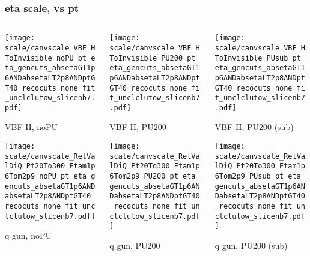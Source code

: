 \documentclass[8pt]{beamer}
\begin{document}
  \begin{frame}
  \frametitle{eta scale, vs pt}
  
  \begin{columns}
   \begin{column}{0.35\textwidth}
     \texttt{[image: scale/canvscale\_VBF\_HToInvisible\_noPU\_pt\_eta\_gencuts\_absetaGT1p6ANDabsetaLT2p8ANDptGT40\_recocuts\_none\_fit\_unclclutow\_slicenb7.pdf]}
     
     VBF H, noPU
    
     \texttt{[image: scale/canvscale\_RelValDiQ\_Pt20To300\_Etam1p6Tom2p9\_noPU\_pt\_eta\_gencuts\_absetaGT1p6ANDabsetaLT2p8ANDptGT40\_recocuts\_none\_fit\_unclclutow\_slicenb7.pdf]}
     
     q gun, noPU
   \end{column}
   \begin{column}{0.35\textwidth}
     \texttt{[image: scale/canvscale\_VBF\_HToInvisible\_PU200\_pt\_eta\_gencuts\_absetaGT1p6ANDabsetaLT2p8ANDptGT40\_recocuts\_none\_fit\_unclclutow\_slicenb7.pdf]}
     
     VBF H, PU200
    
     \texttt{[image: scale/canvscale\_RelValDiQ\_Pt20To300\_Etam1p6Tom2p9\_PU200\_pt\_eta\_gencuts\_absetaGT1p6ANDabsetaLT2p8ANDptGT40\_recocuts\_none\_fit\_unclclutow\_slicenb7.pdf]}
     
     q gun, PU200
   \end{column}
   \begin{column}{0.35\textwidth}
     \texttt{[image: scale/canvscale\_VBF\_HToInvisible\_PUsub\_pt\_eta\_gencuts\_absetaGT1p6ANDabsetaLT2p8ANDptGT40\_recocuts\_none\_fit\_unclclutow\_slicenb7.pdf]}
     
     VBF H, PU200 (sub)
    
     \texttt{[image: scale/canvscale\_RelValDiQ\_Pt20To300\_Etam1p6Tom2p9\_PUsub\_pt\_eta\_gencuts\_absetaGT1p6ANDabsetaLT2p8ANDptGT40\_recocuts\_none\_fit\_unclclutow\_slicenb7.pdf]}
     
     q gun, PU200 (sub)
   \end{column}
  \end{columns}
 \end{frame}
 
\end{document}
